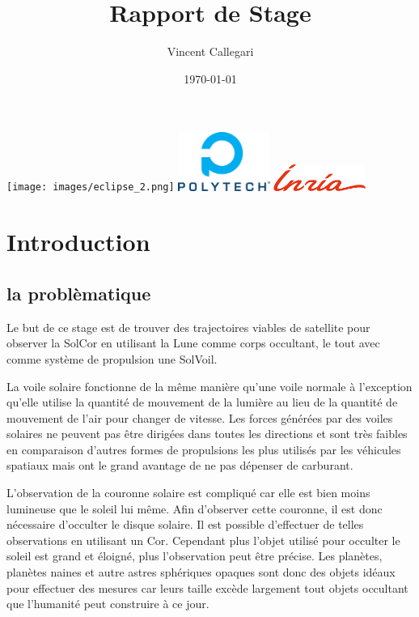 \documentclass[12pt]{article} %
\title{Rapport de Stage} %
\author{Vincent Callegari} %
\date{\today} %
\begin{document}
		\maketitle
		\texttt{[image: images/eclipse\_2.png]}
		\vfill
		\includegraphics[width=3cm]{images/Logo_Reseau_Polytech.png} \hfill \includegraphics[width=3cm]{images/inria.png}
		\newpage
		\tableofcontents
		\newpage
		\section{Introduction}
		
		\subsection{la problèmatique}
		Le but de ce stage est de trouver des trajectoires viables de satellite pour observer la \gls{SolCor} en utilisant la Lune comme corps occultant, le tout avec comme système de propulsion une \gls{SolVoil}.
		
		La voile solaire fonctionne de la même manière qu'une voile normale à l'exception qu'elle utilise la quantité de mouvement de la lumière au lieu de la quantité de mouvement de l'air pour changer de vitesse. Les forces générées par des voiles solaires ne peuvent pas être dirigées dans toutes les directions et sont très faibles en comparaison d'autres formes de propulsions les plus utilisés par les véhicules spatiaux mais ont le grand avantage de ne pas dépenser de carburant.
		
		L'observation de la couronne solaire est compliqué car elle est bien moins lumineuse que le soleil lui même. Afin d'observer cette couronne, il est donc nécessaire d'occulter le disque solaire. Il est possible d'effectuer de telles observations en utilisant un \gls{Cor}. Cependant plus l'objet utilisé pour occulter le soleil est grand et éloigné, plus l'observation peut être précise. Les planètes, planètes naines et autre astres sphériques opaques sont donc des objets idéaux pour effectuer des mesures car leurs taille excède largement tout objets occultant que l'humanité peut construire à ce jour.
		
\end{document}
